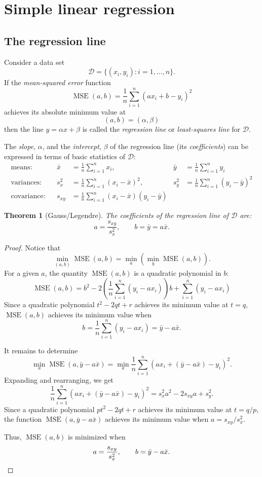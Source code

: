 \documentclass[12pt]{amsart}
\newcommand{\cD}{\mathscr{D}}
\DeclareMathOperator{\MSE}{MSE}
\newtheorem{theorem}{Theorem}
\begin{document}
\section{Simple linear regression}

\subsection{The regression line}
Consider a data set
\[
    \cD=\{(x_i, y_i):i=1,\ldots,n\}.
\]
If the \emph{mean-squared error} function
\[
    \MSE(a,b) = \frac1n\sum_{i=1}^n (a x_i + b - y_i)^2
\]
achieves its absolute minimum value at \[(a,b)=(\alpha, \beta)\] then the line $y=\alpha x+\beta$
is called the \emph{regression line} or \emph{least-squares line} for $\cD$.

The \emph{slope}, $\alpha$, and the \emph{intercept}, $\beta$ of the regression line (its \emph{coefficients}) can be expressed
in terms of basic statistics of $\cD$:
\begin{align*}
    \text{means:}& &\bar{x} &= \frac1n\sum_{i=1}^n x_i,& \bar{y} &= \frac1n\sum_{i=1}^n y_i\\
    \text{variances:}& &s_x^2 &= \frac1n\sum_{i=1}^n (x_i - \bar{x})^2,& s_y^2 &= \frac1n\sum_{i=1}^n (y_i-\bar{y})^2\\
    \text{covariance:}& &s_{xy} &= \frac1n\sum_{i=1}^n (x_i - \bar{x})(y_i-\bar{y})
\end{align*}

\begin{theorem}[Gauss/Legendre]\label{T:GaussLegendre}
The coefficients of the regression line of $\cD$ are:
\[
    a=\frac{s_{xy}}{s_x^2},\qquad b=\bar y = a\bar x.
\]
\end{theorem}
\begin{proof}
    Notice that
    \[
        \min_{(a,b)}
        \MSE(a,b) = \min_a\left(\min_b\MSE(a,b)\right).
    \]
    For a given $a$, the quantity $\MSE(a, b)$ is a quadratic polynomial in $b$:
    \[
        \MSE(a, b)=b^2 - 2\left(\frac1n\sum_{i=1}^n(y_i-ax_i)\right)b + \sum_{i=1}^n(y_i-ax_i)
    \]
    Since a quadratic polynomial $t^2-2qt+r$ achieves its minimum value at $t=q$,
    $\MSE(a, b)$ achieves its minimum value when
    \[
        b=\frac1n\sum_{i=1}^n(y_i-ax_i) = \bar{y}-a\bar{x}.
    \]

    It remains to determine
    \[
        \min_a\MSE(a, \bar y - a\bar x)
        =\min_a \frac1n\sum_{i=1}^n (ax_i + (\bar{y}-a\bar{x}) - y_i)^2.
    \]
    Expanding and rearranging, we get
    \[
        \frac1n\sum_{i=1}^n (ax_i + (\bar{y}-a\bar{x}) - y_i)^2 = s_x^2 a^2 - 2s_{xy}a + s_y^2.
    \]
    Since a quadratic polynomial $pt^2-2qt+r$ achieves its minimum value at $t=q/p$,
    the function $\MSE(a, \bar y - a\bar x)$ achieves its minimum value when $a=s_{xy}/s_x^2$.
    
    Thus, $\MSE(a, b)$ is minimized when
    \[
        a=\frac{s_{xy}}{s_x^2},\qquad b=\bar y - a\bar x.\qedhere
    \]
\end{proof}
\end{document}
